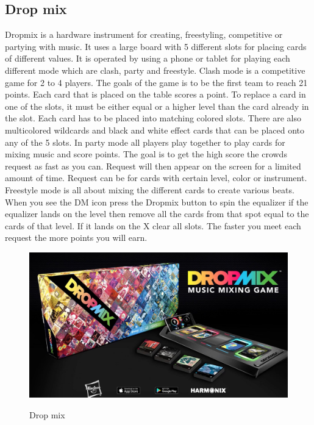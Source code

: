 \subsection{Drop mix}
Dropmix is a hardware instrument for creating, freestyling, competitive or partying with music. It uses a large board with 5 different slots for placing cards of different values. It is operated by using a phone or tablet for playing each different mode which are clash, party and freestyle. Clash mode is a competitive game for 2 to 4 players. The goals of the game is to be the first team to reach 21 points. Each card that is placed on the table scores a point. To replace a card in one of the slots, it must be either equal or a higher level than the card already in the slot. Each card has to be placed into matching colored slots. There are also multicolored wildcards and black and white effect cards that can be placed onto any of the 5 slots. In party mode all players play together to play cards for mixing music and score points. The goal is to get the high score the crowds request as fast as you can. Request will then appear on the screen for a limited amount of time. Request can be for cards with certain level, color or instrument. Freestyle mode is all about mixing the different cards to create various beats. When you see the DM icon press the Dropmix button to spin the equalizer if the equalizer lands on the level then remove all the cards from that spot equal to the cards of that level. If it lands on the X clear all slots. The faster you meet each request the more points you will earn.

\begin{figure}[H]
	\centering
	\includegraphics[width=0.7\linewidth]{figure/Analysis/dropmix}
	\label{fig:dropmix}
	\caption{Drop mix}
\end{figure}


